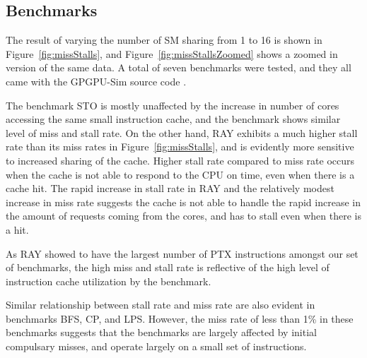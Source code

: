 

\subsection{Benchmarks}
\label{sec:benchmarks}
The result of varying the number of SM sharing from 1 to 16 is shown in Figure~\ref{fig:missStalls}, and Figure~\ref{fig:missStallsZoomed} shows 
a zoomed in version of the same data. A total of seven benchmarks were
tested, and they all came with the GPGPU-Sim source code \cite{bakhodayuan09}.

The benchmark STO is mostly unaffected by the increase in number of cores
accessing the same small instruction cache, and the benchmark shows similar
level of miss and stall rate. 
On the other hand, RAY exhibits a much higher stall rate than its miss rates in Figure~\ref{fig:missStalls}, 
and is evidently more sensitive to increased sharing of the cache.
Higher stall rate compared to miss rate occurs when the cache is not able to 
respond to the CPU on time, even when there is a cache hit.
The rapid increase in stall rate in RAY and the relatively modest increase in miss rate 
suggests the cache is not able to handle the rapid increase in the amount of requests coming from the cores,
and has to stall even when there is a hit.

As RAY showed to have the largest number of PTX instructions amongst our set of benchmarks,
the high miss and stall rate is reflective of the high level of instruction cache utilization
by the benchmark. 

Similar relationship between stall rate and miss rate are also evident in 
benchmarks BFS, CP, and LPS. However, the miss rate of less than 1\% in these benchmarks
suggests that the benchmarks are largely affected by initial compulsary misses, and operate
largely on a small set of instructions.

